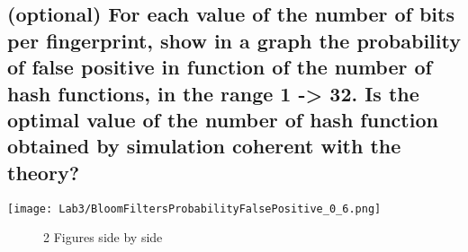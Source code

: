 \documentclass{report}
\begin{document}
				\subsection{(optional) For each value of the number of bits per fingerprint, show in a graph the probability of false positive in function of the number of hash functions, in the range 1 -> 32. Is the optimal value of the number of hash function obtained by simulation coherent with the theory?}
				\texttt{[image: Lab3/BloomFiltersProbabilityFalsePositive\_0\_6.png]}
				\begin{figure}%
				    \centering
				    \qquad
				    \caption{2 Figures side by side}%
				    \label{fig:example}%
				\end{figure}
\end{document}
